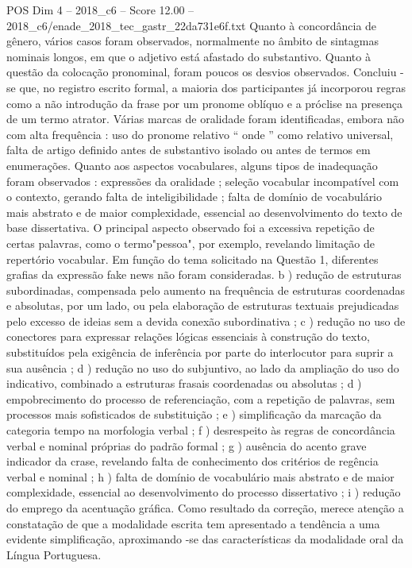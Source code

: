 \begin{textsample}{POS Dim 4 – 2018\_c6 – Score 12.00 – 2018\_c6/enade\_2018\_tec\_gastr\_22da731e6f.txt}
Quanto à concordância de gênero, vários casos foram observados, normalmente no âmbito de sintagmas nominais longos, em que o adjetivo está afastado do substantivo.
Quanto à questão da colocação pronominal, foram poucos os desvios observados.
Concluiu -se que, no registro escrito formal, a maioria dos participantes já incorporou regras como a não introdução da frase por um pronome oblíquo e a próclise na presença de um termo atrator.
Várias marcas de oralidade foram identificadas, embora não com alta frequência : uso do pronome relativo “ onde ” como relativo universal, falta de artigo definido antes de substantivo isolado ou antes de termos em enumerações.
Quanto aos aspectos vocabulares, alguns tipos de inadequação foram observados : expressões da oralidade ; seleção vocabular incompatível com o contexto, gerando falta de inteligibilidade ; falta de domínio de vocabulário mais abstrato e de maior complexidade, essencial ao desenvolvimento do texto de base dissertativa.
O principal aspecto observado foi a excessiva repetição de certas palavras, como o termo"pessoa", por exemplo, revelando limitação de repertório vocabular.
Em função do tema solicitado na Questão 1, diferentes grafias da expressão fake news não foram consideradas. b ) redução de estruturas subordinadas, compensada pelo aumento na frequência de estruturas coordenadas e absolutas, por um lado, ou pela elaboração de estruturas textuais prejudicadas pelo excesso de ideias sem a devida conexão subordinativa ; c ) redução no uso de conectores para expressar relações lógicas essenciais à construção do texto, substituídos pela exigência de inferência por parte do interlocutor para suprir a sua ausência ; d ) redução no uso do subjuntivo, ao lado da ampliação do uso do indicativo, combinado a estruturas frasais coordenadas ou absolutas ; d ) empobrecimento do processo de referenciação, com a repetição de palavras, sem processos mais sofisticados de substituição ; e ) simplificação da marcação da categoria tempo na morfologia verbal ; f ) desrespeito às regras de concordância verbal e nominal próprias do padrão formal ; g ) ausência do acento grave indicador da crase, revelando falta de conhecimento dos critérios de regência verbal e nominal ; h ) falta de domínio de vocabulário mais abstrato e de maior complexidade, essencial ao desenvolvimento do processo dissertativo ; i ) redução do emprego da acentuação gráfica.
Como resultado da correção, merece atenção a constatação de que a modalidade escrita tem apresentado a tendência a uma evidente simplificação, aproximando -se das características da modalidade oral da Língua Portuguesa.

\end{textsample}
